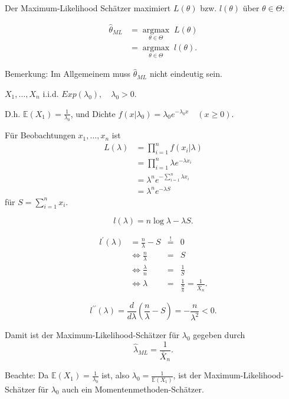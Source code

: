 \documentclass{tstextbook}
\DeclareMathOperator{\argmax}{argmax}
\newcommand{\E}{\mathbb E}
\begin{document}
Der Maximum-Likelihood Schätzer maximiert $ L(\theta) $ bzw. $ l(\theta) $ über $ \theta\in\Theta $: 

\[
\begin{aligned}
	\hat{\theta}_{ML} & = \underset{\theta\in\Theta}{\argmax}\; L(\theta) \\
	& = \underset{\theta\in\Theta}{\argmax}\; l(\theta) .
\end{aligned}
\]

\begin{remark}
	Bemerkung: Im Allgemeinem muss $ \hat{\theta}_{ML} $ nicht eindeutig sein.
\end{remark} 

\begin{example}[Exponentialverteilung]
	$ X_1,\ldots,X_n $ i.i.d. $ Exp(\lambda_0), \quad \lambda_0 >0 $. 
	
	D.h. $ \E(X_1)=\frac{1}{\lambda_0} $, und Dichte $ f(x|\lambda_0) = \lambda_0 e^{-\lambda_0 x} \quad (x\ge0) $.
	
	Für Beobachtungen $ x_1,\ldots,x_n $ ist 
	\[
	\begin{aligned}
		L(\lambda) & = \prod_{i=1}^{n} f(x_i|\lambda) \\
		& = \prod_{i=1}^{n} \lambda e^{-\lambda x_i} \\
		& = \lambda^n e^{-\sum_{i=1}^{n}\lambda x_i} \\
		& = \lambda^n e^{-\lambda S}
	\end{aligned}
	\]
	für $ S = \sum_{i=1}^{n} x_i $.
	
	\[
	l(\lambda) = n \log \lambda - \lambda S.
	\]
	
	\[
	\begin{aligned}
		l^\prime (\lambda) & = \frac{n}{\lambda} - S &  \overset{!}{=} & 0 \\
		& \Leftrightarrow \frac{n}{\lambda} & = & S \\
		& \Leftrightarrow \frac{\lambda}{n} & = & \frac{1}{S} \\
		& \Leftrightarrow \lambda & = & \frac{1}{\frac{S}{n}} = \frac{1}{\bar{X}_n}.
	\end{aligned}
	\]
	
	\[
	l^{\prime\prime} (\lambda) = \frac{d}{d\lambda} \left(\frac{n}{\lambda} - S \right) = - \frac{n}{\lambda^2} < 0.
	\]
	
	Damit ist der Maximum-Likelihood-Schätzer für $ \lambda_0 $ gegeben durch 
	\[
	\hat{\lambda}_{ML} = \frac{1}{\bar{X}_n}.
	\]
\end{example}

\begin{remark}
	Beachte: Da $ \E(X_1)=\frac{1}{\lambda_0} $ ist, also $ \lambda_0 = \frac{1}{\E(X_1)} $, ist der Maximum-Likelihood-Schätzer für $ \lambda_0 $ auch ein Momentenmethoden-Schätzer.
\end{remark}
\end{document}
